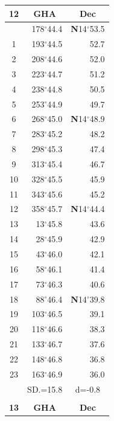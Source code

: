 \documentclass[10pt, a4paper]{report}
\begin{document}
\begin{scriptsize}
\begin{tabular*}{0.2\textwidth}[t]{@{\extracolsep{\fill}}|c|rr|}
\hline
\multicolumn{1}{|c|}{\rule{0pt}{2.6ex}\textbf{12}} & \multicolumn{1}{c}{\textbf{GHA}} & \multicolumn{1}{c|}{\textbf{Dec}}\\
\hline\rule{0pt}{2.6ex}\noindent
0 & 178$^\circ$44.4 & \textbf{N}14$^\circ$53.5\\
1 & 193$^\circ$44.5 & 52.7\\
2 & 208$^\circ$44.6 & 52.0\\
3 & 223$^\circ$44.7 & \raisebox{0.24ex}{\boldmath$\cdot$~\boldmath$\cdot$~~}51.2\\
4 & 238$^\circ$44.8 & 50.5\\
5 & 253$^\circ$44.9 & 49.7\\[2Pt]
6 & 268$^\circ$45.0 & \textbf{N}14$^\circ$48.9\\
7 & 283$^\circ$45.2 & 48.2\\
8 & 298$^\circ$45.3 & 47.4\\
9 & 313$^\circ$45.4 & \raisebox{0.24ex}{\boldmath$\cdot$~\boldmath$\cdot$~~}46.7\\
10 & 328$^\circ$45.5 & 45.9\\
11 & 343$^\circ$45.6 & 45.2\\[2Pt]
12 & 358$^\circ$45.7 & \textbf{N}14$^\circ$44.4\\
13 & 13$^\circ$45.8 & 43.6\\
14 & 28$^\circ$45.9 & 42.9\\
15 & 43$^\circ$46.0 & \raisebox{0.24ex}{\boldmath$\cdot$~\boldmath$\cdot$~~}42.1\\
16 & 58$^\circ$46.1 & 41.4\\
17 & 73$^\circ$46.3 & 40.6\\[2Pt]
18 & 88$^\circ$46.4 & \textbf{N}14$^\circ$39.8\\
19 & 103$^\circ$46.5 & 39.1\\
20 & 118$^\circ$46.6 & 38.3\\
21 & 133$^\circ$46.7 & \raisebox{0.24ex}{\boldmath$\cdot$~\boldmath$\cdot$~~}37.6\\
22 & 148$^\circ$46.8 & 36.8\\
23 & 163$^\circ$46.9 & 36.0\\
\hline
\rule{0pt}{2.4ex} & \multicolumn{1}{c}{SD.=15.8} & \multicolumn{1}{c|}{d=-0.8}\\
\hline
\multicolumn{1}{c}{}\\[-0.5ex]\hline
\multicolumn{1}{|c|}{\rule{0pt}{2.6ex}\textbf{13}} & \multicolumn{1}{c}{\textbf{GHA}} & \multicolumn{1}{c|}{\textbf{Dec}}\\

\end{tabular*}
\end{scriptsize}
\end{document}
